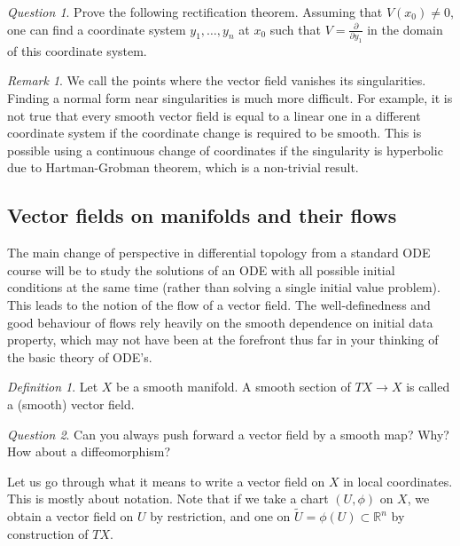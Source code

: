 \documentclass[12pt]{amsart}
\theoremstyle{remark}
\newtheorem{definition}{Definition}
\newtheorem{remark}{Remark}
\newtheorem{question}{Question}
\begin{document}
\begin{question}\label{qrect}
Prove the following rectification theorem. Assuming that $V(x_0)\neq 0$, one can find a coordinate system $y_1,\ldots ,y_n$ at $x_0$ such that $V=\frac{\partial}{\partial y_1}$ in the domain of this coordinate system.
\end{question}

\begin{remark}We call the points where the vector field vanishes its singularities. Finding a normal form near singularities is much more difficult. For example, it is not true that every smooth vector field is equal to a linear one in a different coordinate system if the coordinate change is required to be smooth. This is possible using a continuous change of coordinates if the singularity is hyperbolic due to Hartman-Grobman theorem, which is a non-trivial result.\end{remark}

\subsection{Vector fields on manifolds and their flows}

The main change of perspective in differential topology from a standard ODE course will be to study the solutions of an ODE with all possible initial conditions at the same time (rather than solving a single initial value problem). This leads to the notion of the flow of a vector field. The well-definedness and good behaviour of flows rely heavily on the smooth dependence on initial data property, which may not have been at the forefront thus far in your thinking of the basic theory of ODE's.


\begin{definition}
Let $X$ be a smooth manifold. A smooth section of $TX\to X$ is called a (smooth) vector field.
\end{definition}


\begin{question}
Can you always push forward a vector field by a smooth map? Why? How about a diffeomorphism?
\end{question}

Let us go through what it means to write a vector field on $X$ in local coordinates. This is mostly about notation. Note that if we take a chart $(U,\phi)$ on $X$, we obtain a vector field on $U$ by restriction, and one on $\tilde{U}=\phi(U)\subset \mathbb{R}^n$ by construction of $TX$. 
\end{document}
